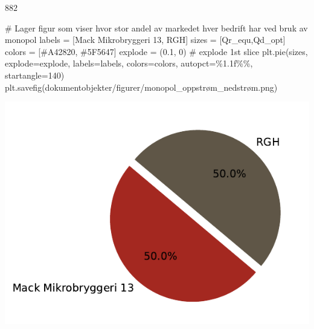 \documentclass[
  12pt,
  a4paper,
  DIV=11,
  numbers=noendperiod]{scrartcl}
\newenvironment{Shaded}{\begin{snugshade}}{\end{snugshade}}
\newcommand{\CommentTok}[1]{\textcolor[rgb]{0.37,0.37,0.37}{#1}}
\newcommand{\DecValTok}[1]{\textcolor[rgb]{0.68,0.00,0.00}{#1}}
\newcommand{\FloatTok}[1]{\textcolor[rgb]{0.68,0.00,0.00}{#1}}
\newcommand{\NormalTok}[1]{\textcolor[rgb]{0.00,0.23,0.31}{#1}}
\newcommand{\OperatorTok}[1]{\textcolor[rgb]{0.37,0.37,0.37}{#1}}
\newcommand{\SpecialCharTok}[1]{\textcolor[rgb]{0.37,0.37,0.37}{#1}}
\newcommand{\StringTok}[1]{\textcolor[rgb]{0.13,0.47,0.30}{#1}}
\begin{document}
$\displaystyle 882$

\begin{Shaded}
\begin{Highlighting}[]
\CommentTok{\# Lager figur som viser hvor stor andel av markedet hver bedrift har ved bruk av monopol}
\NormalTok{labels }\OperatorTok{=}\NormalTok{ [}\StringTok{\textquotesingle{}Mack Mikrobryggeri 13\textquotesingle{}}\NormalTok{, }\StringTok{\textquotesingle{}RGH\textquotesingle{}}\NormalTok{]}
\NormalTok{sizes }\OperatorTok{=}\NormalTok{ [Qr\_equ,Qd\_opt]}
\NormalTok{colors }\OperatorTok{=}\NormalTok{ [}\StringTok{\textquotesingle{}\#A42820\textquotesingle{}}\NormalTok{, }\StringTok{\textquotesingle{}\#5F5647\textquotesingle{}}\NormalTok{]}
\NormalTok{explode }\OperatorTok{=}\NormalTok{ (}\FloatTok{0.1}\NormalTok{, }\DecValTok{0}\NormalTok{)  }\CommentTok{\# explode 1st slice}
\NormalTok{plt.pie(sizes, explode}\OperatorTok{=}\NormalTok{explode, labels}\OperatorTok{=}\NormalTok{labels, colors}\OperatorTok{=}\NormalTok{colors, autopct}\OperatorTok{=}\StringTok{\textquotesingle{}}\SpecialCharTok{\%1.1f\%\%}\StringTok{\textquotesingle{}}\NormalTok{, startangle}\OperatorTok{=}\DecValTok{140}\NormalTok{)}
\NormalTok{plt.savefig(}\StringTok{\textquotesingle{}dokumentobjekter/figurer/monopol\_oppstrøm\_nedstrøm.png\textquotesingle{}}\NormalTok{)}
\end{Highlighting}
\end{Shaded}

\includegraphics{Kandidatnummer_30_mappeoppgave_2_SOK_2030_files/figure-pdf/cell-60-output-1.pdf}
\end{document}
